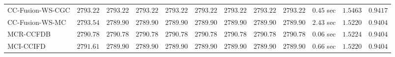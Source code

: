 \begin{table}[H]
\begin{tabular}{lrrrrrrrrrrr}
    CC-Fusion-WS-CGC & $      2793.22$ & $      2793.22$ & $      2793.22$ & $      2793.22$ & $      2793.22$ & $      2793.22$ & $      2793.22$ & $      2793.22$ & $         0.45$ sec    & $       1.5463$  & $       0.9417$ \\ 
     CC-Fusion-WS-MC & $      2793.54$ & $      2789.90$ & $      2789.90$ & $      2789.90$ & $      2789.90$ & $      2789.90$ & $      2789.90$ & $      2789.90$ & $         2.43$ sec    & $       1.5220$  & $       0.9404$ \\ 
\cmidrule{1-1} 
           MCR-CCFDB & $      2790.78$ & $      2790.78$ & $      2790.78$ & $      2790.78$ & $      2790.78$ & $      2790.78$ & $      2790.78$ & $      2790.78$ & $         0.06$ sec    & $       1.5224$  & $       0.9404$ \\ 
\cmidrule{1-1} 
           MCI-CCIFD & $      2791.61$ & $      2789.90$ & $      2789.90$ & $      2789.90$ & $      2789.90$ & $      2789.90$ & $      2789.90$ & $      2789.90$ & $         0.66$ sec    & $       1.5220$  & $       0.9404$ \\ 
\bottomrule
\end{tabular}
\end{table}

